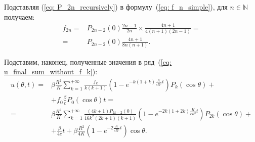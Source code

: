	Подставляя (\ref{eq: P_2n_recursively}) в формулу~(\ref{eq: f_n_simple}), для $n \in \mathbb{N}$ получаем: 
	\begin{equation}
	\label{eq: f_n_simple_final} 
	\begin{split}
	f_{2n} =& P_{2n-2}(0) \frac{2n-1}{2n}\times\frac{4n+1}{4(n+1)(2n-1)} = \\
	=& P_{2n-2}(0) \frac{4n+1}{8n(n+1)}.
	\end{split}
	\end{equation}
	
	Подставим, наконец, полученные значения в ряд~(\ref{eq: u_final_sum_without_f_k}):
	\begin{equation}
   	\label{eq: u_final_sum}
   	 \begin{split}
   	 u(\theta,t) =&  
   	 \beta \frac{R^2}{K}\sum_{k=1}^{+\infty}{
	   		 \frac{f_k}{k(k+1)}\left(1 - e^{-k(1+k)\frac{K}{cR^2} t}
		 \right)P_k(\cos\theta)} + \\
	 &+ f_0 \frac{\beta}{c} P_0(\cos\theta) t = \\
	 =& \beta \frac{R^2}{K}\sum_{k=1}^{+\infty}{
	   		 \frac{(4k+1)P_{2k-2}(0)}{16k^2 (2k+1)(k+1)}\left(1 - e^{-2k(1+2k)\frac{K}{cR^2} t}
		 \right)P_{2k}(\cos\theta)} + \\
	 &+ \frac{\beta}{4c} t + \beta \frac{R^2}{4K}
	   		 \left(1 - e^{-2\frac{K}{cR^2} t}
		 \right)\cos\theta.
   	  \end{split} 
   	 \end{equation}